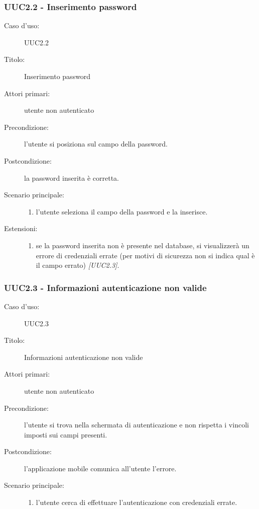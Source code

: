 \documentclass[casi-duso]{subfiles}
\begin{document}
\subsubsection{UUC2.2 - Inserimento password}%
\label{subsub:UUC2.2utente}
\begin{description}
  \item[Caso d’uso:] UUC2.2
  \item[Titolo:] Inserimento password
  \item[Attori primari:] utente non autenticato
  \item[Precondizione:] l'utente si posiziona sul campo della password.
  \item[Postcondizione:] la password inserita è corretta.
  \item[Scenario principale:]
  \begin{enumerate}
    \item l'utente seleziona il campo della password e la inserisce.
  \end{enumerate}
  \item[Estensioni:]
  \begin{enumerate}
    \item se la password inserita non è presente nel database, si visualizzerà un errore di credenziali errate (per motivi di sicurezza non si indica qual è il campo errato) \emph{[UUC2.3]}.
  \end{enumerate}
\end{description}

\subsubsection{UUC2.3 - Informazioni autenticazione non valide}%
\label{subsub:UUC2.3utente}
\begin{description}
  \item[Caso d’uso:] UUC2.3
  \item[Titolo:] Informazioni autenticazione non valide
  \item[Attori primari:] utente non autenticato
  \item[Precondizione:] l'utente si trova nella schermata di autenticazione e non rispetta i vincoli imposti sui campi presenti.
  \item[Postcondizione:] l'applicazione mobile comunica all'utente l'errore.
  \item[Scenario principale:]
        \begin{enumerate}
          \item l'utente cerca di effettuare l'autenticazione con credenziali errate.
        \end{enumerate}
\end{description}
\end{document}
